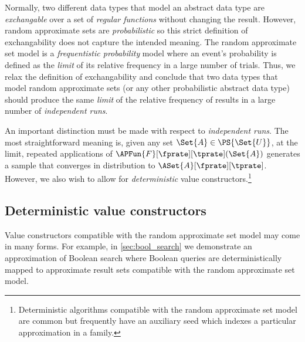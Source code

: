 \documentclass[ ../main.tex]{subfiles}
\newcommand{\ctor}[2]{\APFun{F}[#1][#2]}
\begin{document}
Normally, two different data types that model an abstract data type are \emph{exchangable} over a set of \emph{regular functions} without changing the result.
However, random approximate sets are \emph{probabilistic} so this strict definition of exchangability does not capture the intended meaning.
The random approximate set model is a \emph{frequentistic probability} model where an event's probability is defined as the \emph{limit} of its relative frequency in a large number of trials.
Thus, we relax the definition of exchangability and conclude that two data types that model random approximate sets (or any other probabilistic abstract data type) should produce the same \emph{limit} of the relative frequency of results in a large number of \emph{independent runs}.

An important distinction must be made with respect to \emph{independent runs}.
The most straightforward meaning is, given any set $\Set{A} \in \PS{\Set{U}}$, at the limit, repeated applications of $\ctor{\fprate}{\tprate}(\Set{A})$ generates a sample that converges in distribution to $\ASet{A}[\fprate][\tprate]$.
However, we also wish to allow for \emph{deterministic} value constructors.\footnote{Deterministic algorithms compatible with the random approximate set model are common but frequently have an auxiliary seed which indexes a particular approximation in a family.}

\subsection{Deterministic value constructors}
Value constructors compatible with the random approximate set model may come in many forms.
For example, in \cref{sec:bool_search} we demonstrate an approximation of Boolean search where Boolean queries are deterministically mapped to approximate result sets compatible with the random approximate set model.

\end{document}

